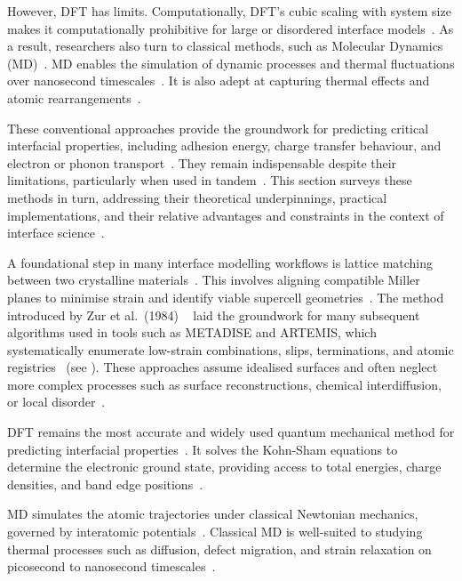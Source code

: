 However, DFT has limits. Computationally, DFT's cubic scaling with system size makes it computationally prohibitive for large or disordered interface models~\cite{Gerber2023-yd}.
As a result, researchers also turn to classical methods, such as Molecular Dynamics (MD)~\cite{Hepplestone2010-vw, Khot2025-hh}.
MD enables the simulation of dynamic processes and thermal fluctuations over nanosecond timescales~\nocite{}.
It is also adept at capturing thermal effects and atomic rearrangements~\cite{Khot2025-hh, Schutt2018-xc}.

These conventional approaches provide the groundwork for predicting critical interfacial properties, including adhesion energy, charge transfer behaviour, and electron or phonon transport~\nocite{}.
They remain indispensable despite their limitations, particularly when used in tandem~\nocite{}.
This section surveys these methods in turn, addressing their theoretical underpinnings, practical implementations, and their relative advantages and constraints in the context of interface science~\nocite{}.

\newpage A foundational step in many interface modelling workflows is lattice matching between two crystalline materials~\cite{Gerber2023-yd, Di_Liberto2022-gz}.
This involves aligning compatible Miller planes to minimise strain and identify viable supercell geometries~\nocite{}.
The method introduced by Zur et al.~(1984) ~\cite{ZurMcGill1984-lattice} laid the groundwork for many subsequent algorithms used in tools such as METADISE and ARTEMIS, which systematically enumerate low-strain combinations, slips, terminations, and atomic registries~\cite{artemis_paper} (see ).
These approaches assume idealised surfaces and often neglect more complex processes such as surface reconstructions, chemical interdiffusion, or local disorder~\nocite{}.

DFT remains the most accurate and widely used quantum mechanical method for predicting interfacial properties~\nocite{}.
It solves the Kohn-Sham equations to determine the electronic ground state, providing access to total energies, charge densities, and band edge positions~\cite{vasp_bulk}.

MD simulates the atomic trajectories under classical Newtonian mechanics, governed by interatomic potentials~\nocite{}.
Classical MD is well-suited to studying thermal processes such as diffusion, defect migration, and strain relaxation on picosecond to nanosecond timescales~\cite{Deng2023-tg}.


